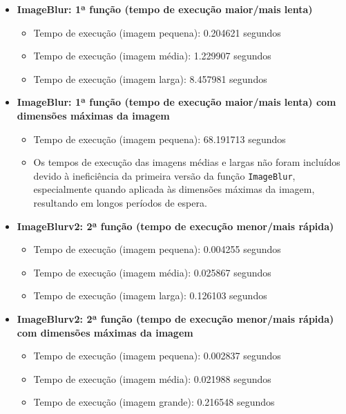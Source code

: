 \documentclass{article}
\begin{document}
\begin{itemize}
    \item \textbf{ImageBlur: 1ª função (tempo de execução maior/mais lenta)}
    \begin{itemize}
        \item Tempo de execução (imagem pequena): 0.204621 segundos
        \item Tempo de execução (imagem média): 1.229907 segundos
        \item Tempo de execução (imagem larga): 8.457981 segundos
    \end{itemize}
    
    \item \textbf{ImageBlur: 1ª função (tempo de execução maior/mais lenta) com dimensões máximas da imagem}
    \begin{itemize}
        \item Tempo de execução (imagem pequena): 68.191713 segundos
        \item Os tempos de execução das imagens médias e largas não foram incluídos devido à ineficiência da primeira versão da função \texttt{ImageBlur}, especialmente quando aplicada às dimensões máximas da imagem, resultando em longos períodos de espera.
    \end{itemize}
    
    \item \textbf{ImageBlurv2: 2ª função (tempo de execução menor/mais rápida)}
    \begin{itemize}
        \item Tempo de execução (imagem pequena): 0.004255 segundos
        \item Tempo de execução (imagem média): 0.025867 segundos
        \item Tempo de execução (imagem larga): 0.126103 segundos
    \end{itemize}
    
    \item \textbf{ImageBlurv2: 2ª função (tempo de execução menor/mais rápida) com dimensões máximas da imagem}
    \begin{itemize}
        \item Tempo de execução (imagem pequena): 0.002837 segundos
        \item Tempo de execução (imagem média): 0.021988 segundos
        \item Tempo de execução (imagem grande): 0.216548 segundos
    \end{itemize}
\end{itemize}
\end{document}
